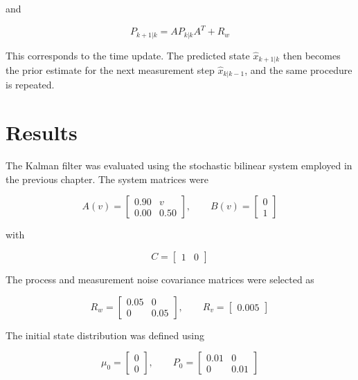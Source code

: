 and

\begin{equation}
    P_{k+1|k}
    =
    AP_{k|k}A^T+R_w
\end{equation}

This corresponds to the time update. The predicted state
\(\hat{x}_{k+1|k}\) then becomes the prior estimate for the next measurement
step \(\hat{x}_{k|k-1}\), and the same procedure is repeated.



\section{Results}
\label{sec:kalman_results}

The Kalman filter was evaluated using the stochastic bilinear system employed
in the previous chapter. The system matrices were

\begin{equation}
    A(v)
    =
    \begin{bmatrix}
        0.90 & v \\
        0.00 & 0.50
    \end{bmatrix},
    \qquad
    B(v)
    =
    \begin{bmatrix}
        0 \\
        1
    \end{bmatrix}
\end{equation}

with

\begin{equation}
    C=
    \begin{bmatrix}
        1 & 0
    \end{bmatrix}
\end{equation}

The process and measurement noise covariance matrices were selected as

\begin{equation}
    R_w=
    \begin{bmatrix}
        0.05 & 0 \\
        0 & 0.05
    \end{bmatrix},
    \qquad
    R_v=
    \begin{bmatrix}
        0.005
    \end{bmatrix}
\end{equation}

The initial state distribution was defined using

\begin{equation}
    \mu_0=
    \begin{bmatrix}
        0 \\
        0
    \end{bmatrix},
    \qquad
    P_0=
    \begin{bmatrix}
        0.01 & 0 \\
        0 & 0.01
    \end{bmatrix}
\end{equation}

